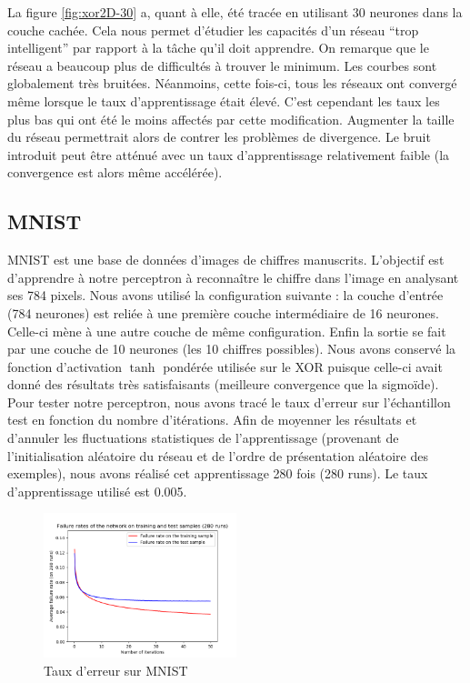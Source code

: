 La figure \ref{fig:xor2D-30} a, quant à elle, été tracée en utilisant 30 neurones dans la couche cachée. Cela nous permet d'étudier les capacités d'un réseau ``trop intelligent'' par rapport à la tâche qu'il doit apprendre. On remarque que le réseau a beaucoup plus de difficultés à trouver le minimum. Les courbes sont globalement très bruitées. Néanmoins, cette fois-ci, tous les réseaux ont convergé même lorsque le taux d'apprentissage était élevé. C'est cependant les taux les plus bas qui ont été le moins affectés par cette modification. Augmenter la taille du réseau permettrait alors de contrer les problèmes de divergence. Le bruit introduit peut être atténué avec un taux d'apprentissage relativement faible (la convergence est alors même accélérée).

\subsection{MNIST}

MNIST est une base de données d'images de chiffres manuscrits. L'objectif est d'apprendre à notre perceptron à reconnaître le chiffre dans l'image en analysant ses 784 pixels. Nous avons utilisé la configuration suivante : la couche d'entrée (784 neurones) est reliée à une première couche intermédiaire de 16 neurones. Celle-ci mène à une autre couche de même configuration. Enfin la sortie se fait par une couche de 10 neurones (les 10 chiffres possibles). Nous avons conservé la fonction d'activation $\tanh$ pondérée utilisée sur le XOR puisque celle-ci avait donné des résultats très satisfaisants (meilleure convergence que la sigmoïde).
Pour tester notre perceptron, nous avons tracé le taux d'erreur sur l'échantillon test en fonction du nombre d'itérations. Afin de moyenner les résultats et d'annuler les fluctuations statistiques de l'apprentissage (provenant de l'initialisation aléatoire du réseau et de l'ordre de présentation aléatoire des exemples),
nous avons réalisé cet apprentissage 280 fois (280 runs). Le taux d'apprentissage utilisé est 0.005.

\begin{figure}[ht]
 \centering
 \includegraphics[width=0.5\textwidth]{img/MNIST.png}
 \caption{Taux d'erreur sur MNIST}
 \label{fig:MNIST}
\end{figure}

